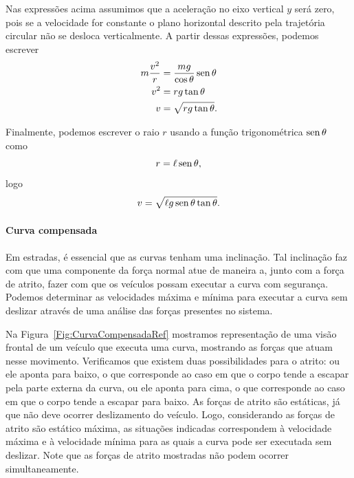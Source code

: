 \noindent{}Nas expressões acima assumimos que a aceleração no eixo vertical $y$ será zero, pois se a velocidade for constante o plano horizontal descrito pela trajetória circular não se desloca verticalmente. A partir dessas expressões, podemos escrever
\begin{align}
    m\frac{v^2}{r} &= \frac{mg}{\cos\theta} \operatorname{sen}\theta \\
    v^2 &= rg \tan\theta \\
    v &= \sqrt{rg\tan\theta}.
\end{align}

Finalmente, podemos escrever o raio $r$ usando a função trigonométrica $\operatorname{sen}\theta$ como
\begin{equation}
    r = \ell \operatorname{sen}\theta,
\end{equation}
%
logo
\begin{equation}
    v = \sqrt{\ell g \operatorname{sen}\theta\tan\theta}.
\end{equation}

\paragraph{Curva compensada}

Em estradas, é essencial que as curvas tenham uma inclinação. Tal inclinação faz com que uma componente da força normal atue de maneira a, junto com a força de atrito, fazer com que os veículos possam executar a curva com segurança. Podemos determinar as velocidades máxima e mínima para executar a curva sem deslizar através de uma análise das forças presentes no sistema.

Na Figura~\ref{Fig:CurvaCompensadaRef} mostramos representação de uma visão frontal de um veículo que executa uma curva, mostrando as forças que atuam nesse movimento. Verificamos que existem duas possibilidades para o atrito: ou ele aponta para baixo, o que corresponde ao caso em que o corpo tende a escapar pela parte externa da curva, ou ele aponta para cima, o que corresponde ao caso em que o corpo tende a escapar para baixo. As forças de atrito são estáticas, já que não deve ocorrer deslizamento do veículo. Logo, considerando as forças de atrito são estático máxima, as situações indicadas correspondem à velocidade máxima e à velocidade mínima para as quais a curva pode ser executada sem deslizar. Note que as forças de atrito mostradas não podem ocorrer simultaneamente.

